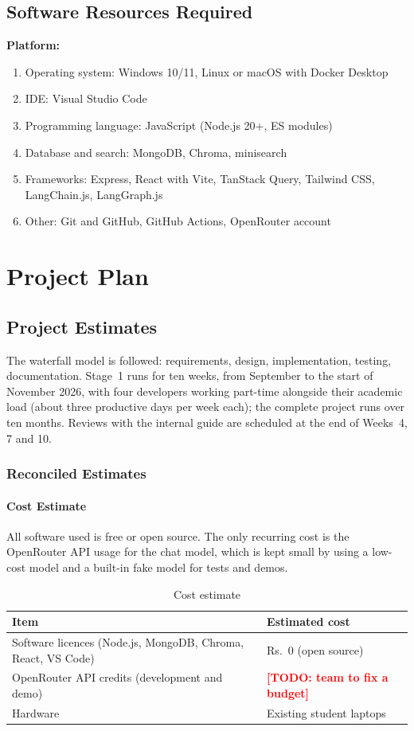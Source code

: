 \documentclass[oneside,a4paper,12pt]{report}
\newcommand{\todo}[1]{\textcolor{red}{\textbf{[TODO: #1]}}}
\begin{document}
\section{Software Resources Required}
\textbf{Platform:}
\begin{enumerate}
  \item Operating system: Windows 10/11, Linux or macOS with Docker Desktop
  \item IDE: Visual Studio Code
  \item Programming language: JavaScript (Node.js 20+, ES modules)
  \item Database and search: MongoDB, Chroma, minisearch
  \item Frameworks: Express, React with Vite, TanStack Query, Tailwind CSS, LangChain.js, LangGraph.js
  \item Other: Git and GitHub, GitHub Actions, OpenRouter account
\end{enumerate}

\chapter{Project Plan}

\section{Project Estimates}
The waterfall model is followed: requirements, design, implementation, testing, documentation. Stage~1 runs for ten weeks, from September to the start of November 2026, with four developers working part-time alongside their academic load (about three productive days per week each); the complete project runs over ten months. Reviews with the internal guide are scheduled at the end of Weeks~4, 7 and 10.

\subsection{Reconciled Estimates}
\subsubsection{Cost Estimate}
All software used is free or open source. The only recurring cost is the OpenRouter API usage for the chat model, which is kept small by using a low-cost model and a built-in fake model for tests and demos.
\begin{table}[H]
\centering
\begin{tabularx}{\textwidth}{|X|X|}
\hline
\textbf{Item} & \textbf{Estimated cost} \\ \hline
Software licences (Node.js, MongoDB, Chroma, React, VS Code) & Rs.~0 (open source) \\ \hline
OpenRouter API credits (development and demo) & \todo{team to fix a budget} \\ \hline
Hardware & Existing student laptops \\ \hline
\end{tabularx}
\caption{Cost estimate}
\end{table}
\end{document}
